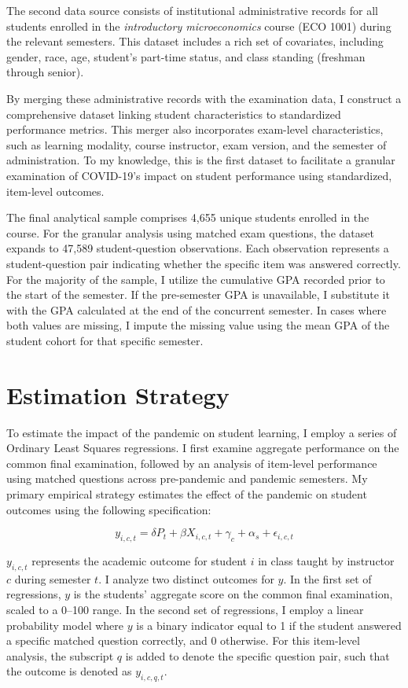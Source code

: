 \documentclass[
  12pt,
  letterpaper,
  DIV=11,
  numbers=noendperiod]{scrartcl}
\begin{document}
The second data source consists of institutional administrative records
for all students enrolled in the \emph{introductory microeconomics}
course (ECO 1001) during the relevant semesters. This dataset includes a
rich set of covariates, including gender, race, age, student's part-time
status, and class standing (freshman through senior).

By merging these administrative records with the examination data, I
construct a comprehensive dataset linking student characteristics to
standardized performance metrics. This merger also incorporates
exam-level characteristics, such as learning modality, course
instructor, exam version, and the semester of administration. To my
knowledge, this is the first dataset to facilitate a granular
examination of COVID-19's impact on student performance using
standardized, item-level outcomes.

The final analytical sample comprises 4,655 unique students enrolled in
the course. For the granular analysis using matched exam questions, the
dataset expands to 47,589 student-question observations. Each
observation represents a student-question pair indicating whether the
specific item was answered correctly. For the majority of the sample, I
utilize the cumulative GPA recorded prior to the start of the semester.
If the pre-semester GPA is unavailable, I substitute it with the GPA
calculated at the end of the concurrent semester. In cases where both
values are missing, I impute the missing value using the mean GPA of the
student cohort for that specific semester.

\section{Estimation Strategy}\label{estimation-strategy}

To estimate the impact of the pandemic on student learning, I employ a
series of Ordinary Least Squares regressions. I first examine aggregate
performance on the common final examination, followed by an analysis of
item-level performance using matched questions across pre-pandemic and
pandemic semesters. My primary empirical strategy estimates the effect
of the pandemic on student outcomes using the following specification:

\begin{equation}
y_{i,c,t} = \delta P_{t} + \beta X_{i,c,t} + \gamma_{c} + \alpha_{s} + \epsilon_{i,c,t}
\end{equation}

\(y_{i,c,t}\) represents the academic outcome for student \(i\) in class
taught by instructor \(c\) during semester \(t\). I analyze two distinct
outcomes for \(y\). In the first set of regressions, \(y\) is the
students' aggregate score on the common final examination, scaled to a
0--100 range. In the second set of regressions, I employ a linear
probability model where \(y\) is a binary indicator equal to 1 if the
student answered a specific matched question correctly, and 0 otherwise.
For this item-level analysis, the subscript \(q\) is added to denote the
specific question pair, such that the outcome is denoted as
\(y_{i,c,q,t}\).
\end{document}
